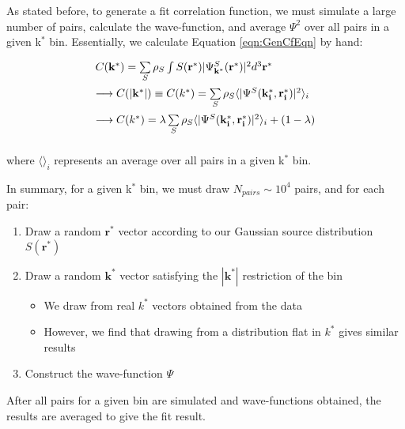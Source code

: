 \documentclass[../AnalysisNoteJBuxton.tex]{subfiles}
\begin{document}
As stated before, to generate a fit correlation function, we must simulate a large number of pairs, calculate the wave-function, and average $\Psi^{2}$ over all pairs in a given k$^{*}$ bin.  Essentially, we calculate Equation \ref{eqn:GenCfEqn} by hand:

\begin{equation}
\begin{array}{l}
\vspace{2mm}
  C(\mathbf{k^{*}}) = \sum\limits_{S}\rho_{S}\int S(\mathbf{r^{*}})|\Psi^{S}_{\mathbf{k^{*}}}(\mathbf{r^{*}})|^{2}d^{3}\mathbf{r^{*}} \\
\vspace{2mm}
  \longrightarrow C(|\mathbf{k^{*}}|) \equiv C(k^{*}) = \sum\limits_{S}\rho_{S}\langle |\Psi^{S}(\mathbf{k^{*}_{i}},\mathbf{r^{*}_{i}})|^{2} \rangle_{i} \\
\vspace{2mm}
  \longrightarrow C(k^{*}) = \lambda\sum\limits_{S}\rho_{S}\langle |\Psi^{S}(\mathbf{k^{*}_{i}},\mathbf{r^{*}_{i}})|^{2} \rangle_{i} + (1-\lambda)

\end{array}
\label{eqn:CoulombEqn2}
\end{equation}

where $\langle \rangle_{i}$ represents an average over all pairs in a given k$^{*}$ bin.

In summary, for a given k$^{*}$ bin, we must draw $N_{pairs} \sim 10^{4}$ pairs, and for each pair:

\begin{enumerate}
 \item Draw a random $\mathbf{r}^{*}$ vector according to our Gaussian source distribution $S(\mathbf{r}^{*})$
 \item Draw a random $\mathbf{k}^{*}$ vector satisfying the $|\mathbf{k}^{*}|$ restriction of the bin
 \begin{itemize}
  \item We draw from real $k^{*}$ vectors obtained from the data
  \item However, we find that drawing from a distribution flat in $k^{*}$ gives similar results
 \end{itemize}
 \item Construct the wave-function $\Psi$
\end{enumerate}

After all pairs for a given \kstar bin are simulated and wave-functions obtained, the results are averaged to give the fit result.
\end{document}
